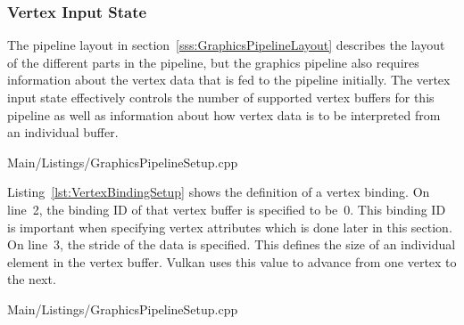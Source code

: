       \subsubsection{Vertex Input State}
      \label{sss:VertexInputStateSetup}
        The pipeline layout in section~\ref{sss:GraphicsPipelineLayout} describes the layout of the different parts in the pipeline, but the graphics pipeline also requires information about the vertex data that is fed to the pipeline initially.
        The vertex input state effectively controls the number of supported vertex buffers for this pipeline as well as information about how vertex data is to be interpreted from an individual buffer.

        
        {Main/Listings/GraphicsPipelineSetup.cpp}

        Listing~\ref{lst:VertexBindingSetup} shows the definition of a vertex binding.
        On line~2, the binding ID of that vertex buffer is specified to be~0.
        This binding ID is important when specifying vertex attributes which is done later in this section.
        On line~3, the stride of the data is specified.
        This defines the size of an individual element in the vertex buffer.
        Vulkan uses this value to advance from one vertex to the next.

        
        {Main/Listings/GraphicsPipelineSetup.cpp}


